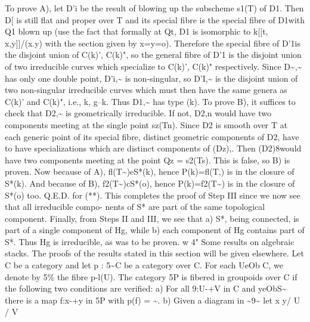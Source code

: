 \documentclass[11pt]{article}
\theoremstyle{plain}
\theoremstyle{definition}
\theoremstyle{remark}
\begin{document}
To prove A), let D'i be the result of blowing up the subscheme s1(T) of D1. Then D[ is still flat and proper over T and its special fibre is the special fibre of D1with Q1 blown up (use the fact that formally at Qt, D1 is isomorphic to k[[t, x,y]]/(x.y) with the section given by x=y=o). Therefore the special fibre of D'1is the disjoint union of C(k)', C(k)", so the general fibre of D'1 is the disjoint union of two irreducible curves which specialize to C(k)', C(k)" respectively. Since D\textasciitilde{},\textasciitilde{} has only one double point, D'i,\textasciitilde{} is non-singular, so D'I,\textasciitilde{} is the disjoint union of two non-singular irreducible curves which must then have the same genera as C(k)' and C(k)", i.e., k, g--k. Thus D1,\textasciitilde{} has type (k). To prove B), it suffices to check that D2,\textasciitilde{} is geometrically irreducible. If not, D2,n would have two components meeting at the single point sz(Tn). Since D2 is smooth over T at each generic point of its special fibre, distinct geometric components of D2, have to have specializations which are distinct components of (Dz),. Then (D2)8would have two components meeting at the point Qz = s2(Ts). This is false, so B) is proven. Now because of A), fl(T\textasciitilde{})eS*(k), hence P(k)=fl(T,) is in the closure of S*(k). And because of B), f2(T\textasciitilde{})cS*(o), hence P(k)=f2(T\textasciitilde{}) is in the closure of S*(o) too. Q.E.D. for (**). This completes the proof of Step III since we now see that all irreducible compo- nents of S* are part of the same topological component. Finally, from Steps II and III, we see that a) S*, being connected, is part of a single component of Hg, while b) each component of Hg contains part of S*. Thus Hg is irreducible, as was to be proven. w 4" Some results on algebraic stacks. The proofs of the results stated in this section will be given elsewhere. Let C be a category and let p : 5\textasciitilde{}C be a category over C. For each UeOb C, we denote by 5\% the fibre p-l(U). The category 5P is fibered in groupoids over C if the following two conditions are verified: a) For all 9:U-+V in C and yeObS\textasciitilde{} there is a map f:x-+y in 5P with p(f) = \textasciitilde{}. b) Given a diagram in \textasciitilde{}9\textasciitilde{} let x y/ U / V
\end{document}
